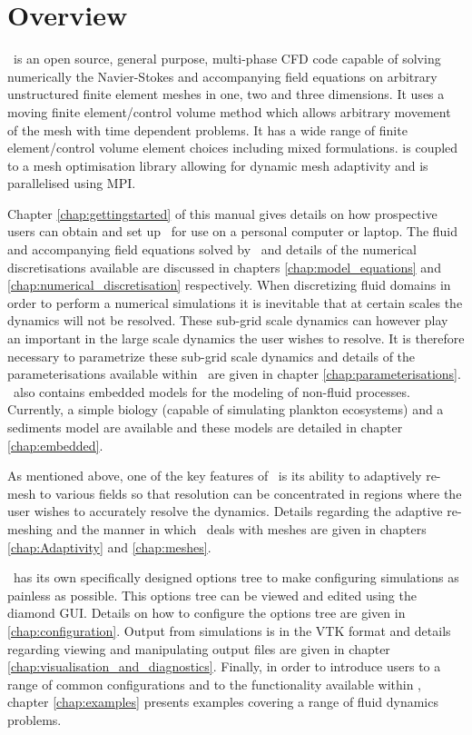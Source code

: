 \chapter*{Overview}

\fluidity\ is an open source, general purpose, multi-phase CFD code capable of solving numerically the Navier-Stokes and accompanying field equations on arbitrary unstructured finite element meshes in one, two and three dimensions. It uses a moving finite element/control volume method which allows arbitrary movement of the mesh with time dependent problems. It has a wide range of finite element/control volume element choices including mixed formulations. \fluidity is coupled to a mesh optimisation library allowing for dynamic mesh adaptivity and is parallelised using MPI.

Chapter \ref{chap:gettingstarted} of this manual gives details on how prospective users can obtain and set up \fluidity\ for use on a personal computer or laptop. The fluid and accompanying field equations solved by \fluidity\ and details of the numerical discretisations available are discussed in chapters \ref{chap:model_equations} and \ref{chap:numerical_discretisation} respectively. When discretizing fluid domains in order to perform a numerical simulations it is inevitable that at certain scales the dynamics will not be resolved. These sub-grid scale dynamics can however play an important in the large scale dynamics the user wishes to resolve. It is therefore necessary to parametrize these sub-grid scale dynamics and details of the parameterisations available within \fluidity\ are given in chapter \ref{chap:parameterisations}. \fluidity\ also contains embedded models for the modeling of non-fluid processes. Currently, a simple biology (capable of simulating plankton ecosystems) and a sediments model are available and these models are detailed in chapter \ref{chap:embedded}.

As mentioned above, one of the key features of \fluidity\ is its ability to adaptively re-mesh to various fields so that resolution can be concentrated in regions where the user wishes to accurately resolve the dynamics. Details regarding the adaptive re-meshing and the manner in which \fluidity\ deals with meshes are given in chapters \ref{chap:Adaptivity} and \ref{chap:meshes}.

\fluidity\ has its own specifically designed options tree to make configuring simulations as painless as possible. This options tree can be viewed and edited using the diamond GUI. Details on how to configure the options tree are given in \ref{chap:configuration}. Output from simulations is in the VTK format and details regarding viewing and manipulating output files are given in chapter \ref{chap:visualisation_and_diagnostics}. Finally, in order to introduce users to a range of common configurations and to the functionality available within \fluidity, chapter \ref{chap:examples} presents examples covering a range of fluid dynamics problems.